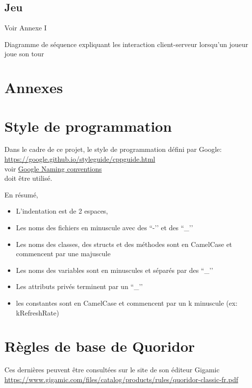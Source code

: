 \documentclass[french, utf8]{article}
\begin{document}


\subsection{Jeu}
Voir Annexe I

Diagramme de séquence expliquant les interaction client-serveur lorsqu'un joueur joue son tour


\section{Annexes}
\appendix

\label{sec:Annexes}
\section{Style de programmation}

Dans le cadre de ce projet, le style de programmation défini par Google:
\\ \href{https://google.github.io/styleguide/cppguide.html}{https://google.github.io/styleguide/cppguide.html}
\\ voir \href{https://google.github.io/styleguide/cppguide.html#Naming}{Google Naming conventions}
\\doit être utilisé.

En résumé,
\begin{itemize}
	\item L'indentation est de 2 espaces,
	\item Les noms des fichiers en minuscule avec des ``-’’ et des ``\_’’
	\item Les noms des classes, des structs et des méthodes sont en CamelCase et commencent par une majuscule
	\item Les noms des variables sont en minuscules et séparés par des ``\_’’
	\item Les attributs privés terminent par un ``\_’’
	\item les constantes sont en CamelCase et commencent par un k minuscule (ex: kRefreshRate)
\end{itemize}

\section{Règles de base de Quoridor}
Ces dernières peuvent être consultées sur le site de son éditeur Gigamic \\\href{https://www.gigamic.com/files/catalog/products/rules/quoridor-classic-fr.pdf}{https://www.gigamic.com/files/catalog/products/rules/quoridor-classic-fr.pdf}
\end{document}
